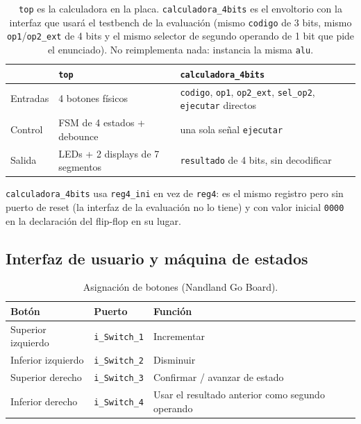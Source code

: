 \documentclass[11pt,a4paper]{article}
\newcommand{\bit}[1]{\texttt{#1}}
\newcommand{\sig}[1]{\texttt{#1}}
\begin{document}
\begin{table}[H]
\centering
\small
\begin{tabular}{@{}lp{6.2cm}p{6.2cm}@{}}
\toprule
 & \textbf{\sig{top}} & \textbf{\sig{calculadora\_4bits}} \\
\midrule
Entradas & 4 botones físicos & \sig{codigo}, \sig{op1}, \sig{op2\_ext}, \sig{sel\_op2}, \sig{ejecutar} directos \\
Control & FSM de 4 estados + debounce & una sola señal \sig{ejecutar} \\
Salida & LEDs + 2 displays de 7 segmentos & \sig{resultado} de 4 bits, sin decodificar \\
\bottomrule
\end{tabular}
\caption{\sig{top} es la calculadora en la placa. \sig{calculadora\_4bits} es el envoltorio con la interfaz que usará el testbench de la evaluación (mismo \sig{codigo} de 3 bits, mismo \sig{op1}/\sig{op2\_ext} de 4 bits y el mismo selector de segundo operando de 1 bit que pide el enunciado). No reimplementa nada: instancia la misma \sig{alu}.}
\end{table}

\sig{calculadora\_4bits} usa \sig{reg4\_ini} en vez de \sig{reg4}: es el mismo registro pero sin puerto de reset (la interfaz de la evaluación no lo tiene) y con valor inicial \bit{0000} en la declaración del flip-flop en su lugar.

\subsection{Interfaz de usuario y máquina de estados}

\begin{table}[H]
\centering
\begin{tabular}{@{}lll@{}}
\toprule
\textbf{Botón} & \textbf{Puerto} & \textbf{Función} \\
\midrule
Superior izquierdo & \sig{i\_Switch\_1} & Incrementar \\
Inferior izquierdo & \sig{i\_Switch\_2} & Disminuir \\
Superior derecho   & \sig{i\_Switch\_3} & Confirmar / avanzar de estado \\
Inferior derecho   & \sig{i\_Switch\_4} & Usar el resultado anterior como segundo operando \\
\bottomrule
\end{tabular}
\caption{Asignación de botones (Nandland Go Board).}
\end{table}
\end{document}
